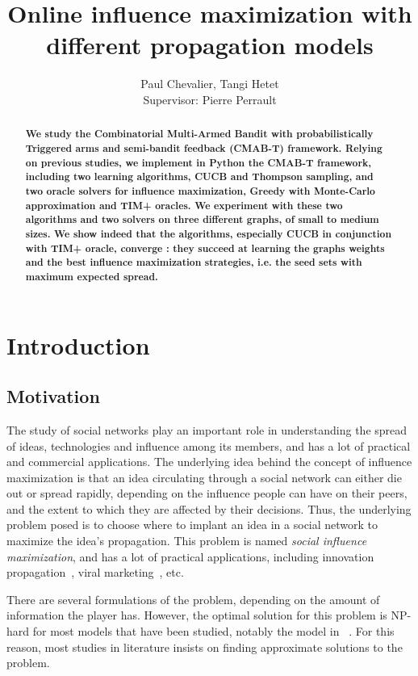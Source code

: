 \documentclass[a4paper,12pt]{article}
\title{Online influence maximization with different propagation models}
\author{Paul Chevalier, Tangi Hetet\\[0.5cm]{Supervisor: Pierre Perrault}}
\begin{document}
\maketitle

\begin{abstract}
\textbf{
We study the Combinatorial Multi-Armed Bandit with probabilistically Triggered arms and semi-bandit feedback (CMAB-T) framework. Relying on previous studies, we implement in Python the CMAB-T framework, including two learning algorithms, CUCB and Thompson sampling, and two oracle solvers for influence maximization, Greedy with Monte-Carlo approximation and TIM+ oracles. We experiment with these two algorithms and two solvers on three different graphs, of small to medium sizes. We show indeed that the algorithms, especially CUCB in conjunction with TIM+ oracle, converge : they succeed at learning the graphs weights and the best influence maximization strategies, i.e. the seed sets with maximum expected spread.
}
\end{abstract}

\section{Introduction}
\label{scn:intro}

\subsection{Motivation}

The study of social networks play an important role in understanding the spread of ideas, technologies and influence among its members, and has a lot of practical and commercial applications. The underlying idea behind the concept of influence maximization is that an idea circulating through a social network can either die out or spread rapidly, depending on the influence people can have on their peers, and the extent to which they are affected by their decisions. Thus, the underlying problem posed is to choose where to implant an idea in a social network to maximize the idea's propagation. This problem is named \emph{social influence maximization}, and has a lot of practical applications, including innovation propagation~\cite{coleman1966medical}, viral marketing~\cite{bass1976new}, etc.

There are several formulations of the problem, depending on the amount of information the player has. However, the optimal solution for this problem is NP-hard for most models that have been studied, notably the model in ~\cite{domingos2001mining}. For this reason, most studies in literature insists on finding approximate solutions to the problem.
\end{document}
